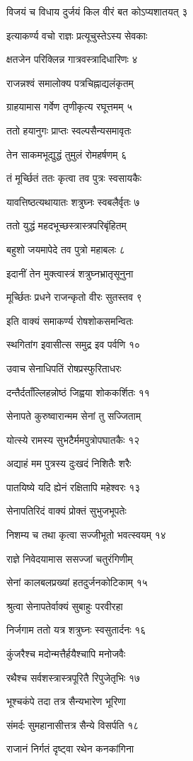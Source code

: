 विजयं च विधाय दुर्जयं किल वीरं बत कोऽप्यशातयत् ३

इत्याकर्ण्य वचो राज्ञः प्रत्यूचुस्तेऽस्य सेवकाः

क्षतजेन परिक्लिन्न गात्रवस्त्रादिधारिणः ४

राजन्नश्वं समालोक्य पत्रचिह्नाद्यलंकृतम्

ग्राहयामास गर्वेण तृणीकृत्य रघूत्तमम् ५

ततो हयानुगः प्राप्तः स्वल्पसैन्यसमावृतः

तेन साकमभूद्युद्धं तुमुलं रोमहर्षणम् ६

तं मूर्च्छितं ततः कृत्वा तव पुत्रः स्वसायकैः

यावत्तिष्ठत्यथायातः शत्रुघ्नः स्वबलैर्वृतः ७

ततो युद्धं महदभूच्छस्त्रास्त्रपरिबृंहितम्

बहुशो जयमापेदे तव पुत्रो महाबलः ८

इदानीं तेन मुक्त्वास्त्रं शत्रुघ्नभ्रातृसूनुना

मूर्च्छितः प्रधने राजन्कृतो वीरः सुतस्तव ९

इति वाक्यं समाकर्ण्य रोषशोकसमन्वितः

स्थगितांग इवासीत्स समुद्र इव पर्वणि १०

उवाच सेनाधिपतिं रोषप्रस्फुरिताधरः

दन्तैर्दताँल्लिहन्नोष्ठं जिह्वया शोककर्शितः ११

सेनापते कुरुष्वारान्मम सेनां तु सज्जिताम्

योत्स्ये रामस्य सुभटैर्ममपुत्रोपघातकैः १२

अद्याहं मम पुत्रस्य दुःखदं निशितैः शरैः

पातयिष्ये यदि ह्येनं रक्षितापि महेश्वरः १३

सेनापतिरिदं वाक्यं प्रोक्तं सुभुजभूपतेः

निशम्य च तथा कृत्वा सज्जीभूतो भवत्स्वयम् १४

राज्ञे निवेदयामास ससज्जां चतुरंगिणीम्

सेनां कालबलप्रख्यां हतदुर्जनकोटिकाम् १५

श्रुत्वा सेनापतेर्वाक्यं सुबाहुः परवीरहा

निर्जगाम ततो यत्र शत्रुघ्नः स्वसुतार्दनः १६

कुंजरैश्च मदोन्मत्तैर्हयैश्चापि मनोजवैः

रथैश्च सर्वशस्त्रास्त्रपूरितै रिपुजेतृभिः १७

भूश्चकंपे तदा तत्र सैन्यभारेण भूरिणा

संमर्दः सुमहानासीत्तत्र सैन्ये विसर्पति १८

राजानं निर्गतं दृष्ट्वा रथेन कनकांगिना

